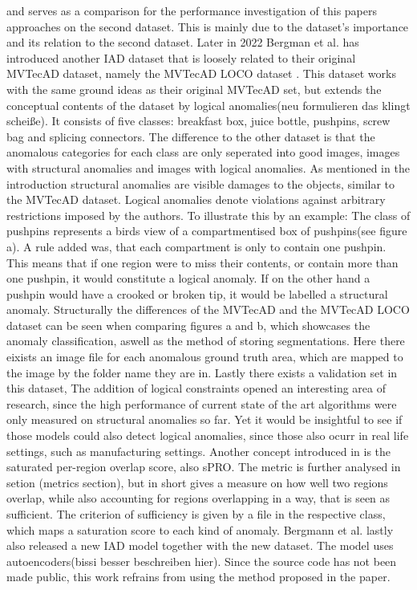 and serves as a comparison for the performance investigation of this papers approaches on the second dataset. This is mainly due to the dataset's importance and 
its relation to the second dataset.
\newline
Later in 2022 Bergman et al. has introduced another IAD dataset that is loosely related to their original MVTecAD dataset, namely the MVTecAD LOCO dataset \cite{LOCODentsAndScratchesBergmann2022}. 
This dataset works with the same ground ideas as their original MVTecAD set, but extends the conceptual contents of the dataset by logical anomalies(neu formulieren das klingt scheiße). 
It consists of five classes: breakfast box, juice bottle, pushpins, screw bag and splicing connectors. The difference to the other dataset is that the anomalous categories for each class are only seperated into good images, images with structural anomalies 
and images with logical anomalies. As mentioned in the introduction structural anomalies are visible damages to the objects, similar to the MVTecAD dataset. Logical anomalies denote violations against arbitrary restrictions 
imposed by the authors. To illustrate this by an example: The class of pushpins represents a birds view of a compartmentised box of pushpins(see figure a). A rule added was, 
that each compartment is only to contain one pushpin. This means that if one region were to miss their contents, or contain more than one pushpin, it would constitute a logical anomaly. If on the 
other hand a pushpin would have a crooked or broken tip, it would be  labelled a structural anomaly. Structurally the differences of the 
MVTecAD and the MVTecAD LOCO dataset can be seen when comparing figures a and b, which showcases the anomaly classification, aswell as 
the method of storing segmentations. Here there eixists an image file for each anomalous ground truth area, which are mapped to the image 
by the folder name they are in. Lastly there exists a validation set in this dataset,
\newline
The addition of logical constraints opened an interesting area of research, since the high performance 
of current state of the art algorithms were only measured on structural anomalies so far. Yet it would be insightful to see if those models could also detect logical anomalies, since those also ocurr 
in real life settings, such as manufacturing settings. Another concept introduced in \cite{LOCODentsAndScratchesBergmann2022} is the 
saturated per-region overlap score, also sPRO. The metric is further analysed in setion (metrics section), but in short gives a measure 
on how well two regions overlap, while also accounting for regions overlapping in a way, that is seen as sufficient. The criterion of 
sufficiency is given by a file in the respective class, which maps a saturation score to each kind of anomaly.
Bergmann et al.\cite{LOCODentsAndScratchesBergmann2022} lastly also released a new IAD model together with the new dataset. The model uses autoencoders(bissi besser beschreiben hier). Since the source code has not been made public, 
this work refrains from using the method proposed in the paper.


